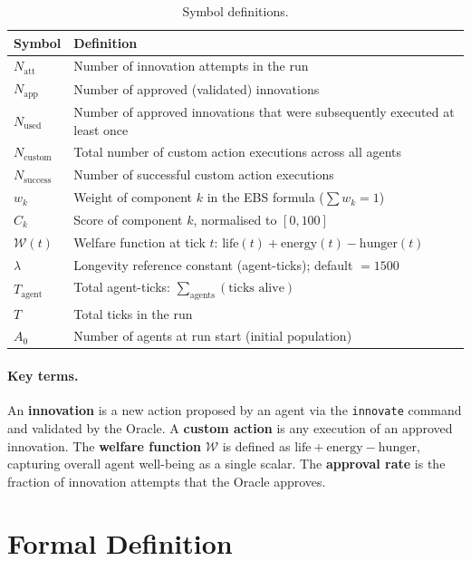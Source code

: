 \documentclass[a4paper, 11pt]{article}
\newcommand{\Natt}{N_{\text{att}}}
\newcommand{\Napp}{N_{\text{app}}}
\newcommand{\Nused}{N_{\text{used}}}
\newcommand{\Ncustom}{N_{\text{custom}}}
\newcommand{\Nsuccess}{N_{\text{success}}}
\newcommand{\welfare}{\mathcal{W}}
\begin{document}
\begin{table}[ht]
\centering
\caption{Symbol definitions.}
\label{tab:notation}
\begin{tabular}{@{}lp{10cm}@{}}
\toprule
\textbf{Symbol} & \textbf{Definition} \\
\midrule
$\Natt$ & Number of innovation attempts in the run \\
$\Napp$ & Number of approved (validated) innovations \\
$\Nused$ & Number of approved innovations that were subsequently executed at least once \\
$\Ncustom$ & Total number of custom action executions across all agents \\
$\Nsuccess$ & Number of successful custom action executions \\
$w_k$ & Weight of component $k$ in the EBS formula ($\sum w_k = 1$) \\
$C_k$ & Score of component $k$, normalised to $[0, 100]$ \\
$\welfare(t)$ & Welfare function at tick $t$: $\text{life}(t) + \text{energy}(t) - \text{hunger}(t)$ \\
$\lambda$ & Longevity reference constant (agent-ticks); default $= 1500$ \\
$T_{\text{agent}}$ & Total agent-ticks: $\sum_{\text{agents}} (\text{ticks alive})$ \\
$T$ & Total ticks in the run \\
$A_0$ & Number of agents at run start (initial population) \\
\bottomrule
\end{tabular}
\end{table}

\paragraph{Key terms.}
An \textbf{innovation} is a new action proposed by an agent via the \texttt{innovate} command and validated by the Oracle. A \textbf{custom action} is any execution of an approved innovation. The \textbf{welfare function} $\welfare$ is defined as $\text{life} + \text{energy} - \text{hunger}$, capturing overall agent well-being as a single scalar. The \textbf{approval rate} is the fraction of innovation attempts that the Oracle approves.

\section{Formal Definition}
\end{document}
